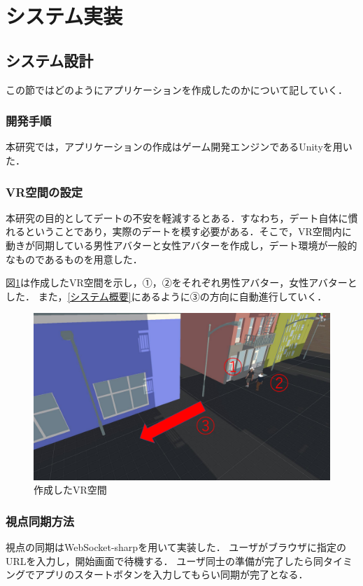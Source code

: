 \documentclass[12pt,a4j,titlepage]{ltjsarticle}
\begin{document}
\clearpage


\section{システム実装}
\subsection{システム設計}
この節ではどのようにアプリケーションを作成したのかについて記していく．
\subsubsection{開発手順}
本研究では，アプリケーションの作成はゲーム開発エンジンであるUnityを用いた．

\label{sec:0}
\subsubsection{VR空間の設定}
本研究の目的としてデートの不安を軽減するとある．すなわち，デート自体に慣れるということであり，実際のデートを模す必要がある．そこで，VR空間内に動きが同期している男性アバターと女性アバターを作成し，デート環境が一般的なものであるものを用意した．

図\ref{fig:screen}は作成したVR空間を示し，①，②をそれぞれ男性アバター，女性アバターとした．
また，\ref{システム概要}にあるように③の方向に自動進行していく．

\begin{figure}[h]
\begin{center}
\includegraphics[keepaspectratio, scale=0.5]{screenshot.pdf}
\end{center}
 \caption{作成したVR空間}
 \label{fig:screen}
\end{figure}
\subsubsection{視点同期方法}
視点の同期はWebSocket-sharpを用いて実装した．
ユーザがブラウザに指定のURLを入力し，開始画面で待機する．
ユーザ同士の準備が完了したら同タイミングでアプリのスタートボタンを入力してもらい同期が完了となる．
\clearpage
\end{document}
